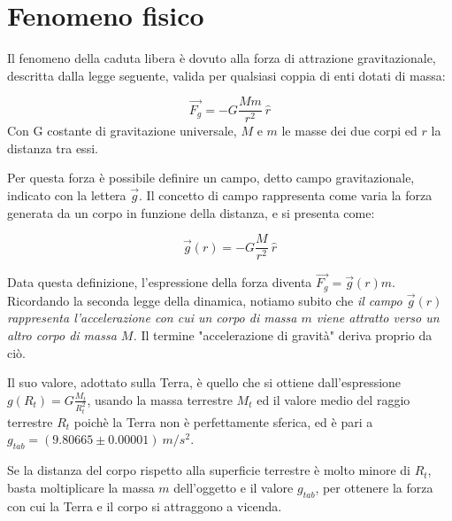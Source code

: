 \documentclass[12pt, a4paper]{article}
\title{\textbf{\scalebox{1.3}{\text{Caduta libera}}}}
\date{}
\begin{document}
\maketitle
{}%

\section{Fenomeno fisico}
Il fenomeno della caduta libera è dovuto alla forza di attrazione gravitazionale, descritta dalla legge seguente, valida per qualsiasi coppia di enti dotati di massa: 


\begin{equation*}
    \Vec{F_g} = -G\frac{M m}{r^2}\ \hat{r}
\end{equation*}
Con G costante di gravitazione universale, $M$ e $m$ le masse dei due corpi ed $r$ la distanza tra essi.

Per questa forza è possibile definire un campo, detto campo gravitazionale, indicato con la lettera $\Vec{g}$. 
Il concetto di campo rappresenta come varia la forza generata da un corpo in funzione della distanza, e si presenta come: 

\begin{equation*}
    \Vec{g}(r) = -G\frac{M}{r^2}\  \hat{r}
\end{equation*}

Data questa definizione, l'espressione della forza diventa $\Vec{F_g} = \Vec{g}(r)m$. 
Ricordando la seconda legge della dinamica, notiamo subito che \textit{il campo $\Vec{g}(r)$ rappresenta l'accelerazione con cui un corpo di massa $m$ viene attratto verso un altro corpo di massa $M$.} 
Il termine "accelerazione di gravità" deriva proprio da ciò.

Il suo valore, adottato sulla Terra, è quello che si ottiene dall'espressione $\displaystyle {g(R_t) = G\frac{M_t}{R_t^2}}$, usando la massa terrestre $M_t$ ed il valore medio del raggio terrestre $R_t$ poichè la Terra non è perfettamente sferica, ed è pari a $g_{tab}=(9.80665\pm 0.00001)\ m/s^2$.

Se la distanza del corpo rispetto alla superficie terrestre è molto minore di $R_t$, basta moltiplicare la massa $m$ dell'oggetto e il valore $g_{tab}$, per ottenere la forza con cui la Terra e il corpo si attraggono a vicenda.
\end{document}
